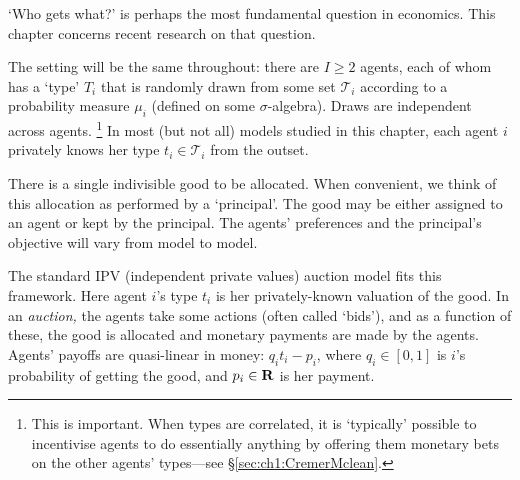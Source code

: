 






`Who gets what?' is perhaps the most fundamental question in economics.
This chapter concerns recent research on that question.

The setting will be the same throughout: there are $I \geq 2$ agents, each of whom has a `type' $T_i$ that is randomly drawn from some set $\mathcal{T}_i$
according to a probability measure $\mu_i$
(defined on some $\sigma$-algebra).
Draws are independent across agents.%
	\footnote{This is important. When types are correlated, it is `typically' possible to incentivise agents to do essentially anything by offering them monetary bets on the other agents' types---see §\ref{sec:ch1:CremerMclean}.}
In most (but not all) models studied in this chapter, each agent $i$ privately knows her type $t_i \in \mathcal{T}_i$ from the outset.

There is a single indivisible good to be allocated.
When convenient, we think of this allocation as performed by a `principal'.
The good may be either assigned to an agent or kept by the principal.
The agents' preferences and the principal's objective will vary from model to model.

The standard IPV (independent private values) auction model fits this framework.
Here agent $i$'s type $t_i$ is her privately-known valuation of the good.
In an \emph{auction,} the agents take some actions (often called `bids'),
and as a function of these, the good is allocated and monetary payments are made by the agents.
Agents' payoffs are quasi-linear in money: $q_i t_i - p_i$, where $q_i \in [0,1]$ is $i$'s probability of getting the good, and $p_i \in \mathbf{R}$ is her payment.


